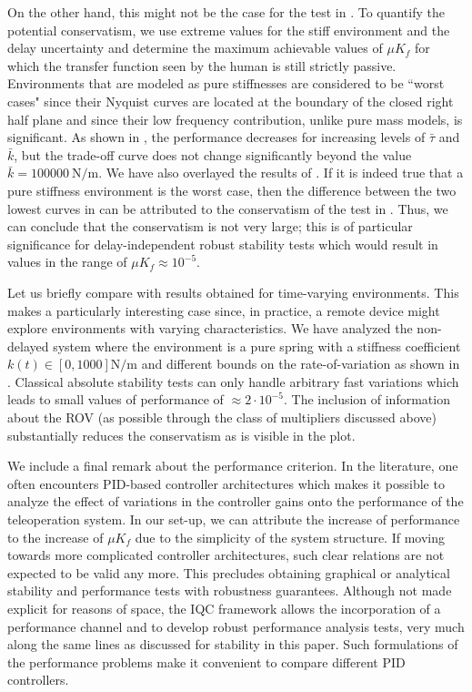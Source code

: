 On the other hand, this might not be the case for the test in . To
quantify the potential conservatism, we use extreme values for
the stiff environment and the delay uncertainty and determine
the maximum achievable values of $\mu K_f$ for which the transfer
function seen by the human is still strictly passive. Environments that
are modeled as pure stiffnesses are considered to be ``worst
cases" since their Nyquist curves are located at the boundary
of the closed right half plane and since their low frequency
contribution, unlike pure mass models, is significant. As shown in
, the performance decreases for increasing
levels of $\bar{\tau}$ and $\bar{k}$, but the trade-off curve does not change
significantly beyond the value $\bar{k} = \SI{100000}{\newton\per\metre}$. We have
also overlayed the results of . If it is indeed true
that a pure stiffness environment is the worst case, then the
difference between the two lowest curves in  can
be attributed to the conservatism of the test in .
Thus, we can conclude that the conservatism is not very large; this is of particular
significance for delay-independent robust stability tests which
would result in values in the range of $\mu K_f \approx 10^{-5}$.


Let us briefly compare with results obtained for time-varying
environments. This makes a particularly interesting
case since, in practice, a remote device might explore environments
with varying characteristics. We have analyzed
the non-delayed system where the environment is a pure
spring with a stiffness coefficient $k(t) \in [0,1000]\si{\newton\per\metre}$ and
different bounds on the rate-of-variation as shown in .
Classical absolute stability tests can only handle arbitrary
fast variations which leads to small values of performance
of $\approx 2\cdot 10^{-5}$. The inclusion of information about the ROV
(as possible through the class of multipliers discussed above)
substantially reduces the conservatism as is visible in the plot.



We include a final remark about the performance criterion.
In the literature, one often encounters PID-based controller
architectures which makes it possible to analyze the effect
of variations in the controller gains onto the performance of
the teleoperation system. In our set-up, we can attribute the increase of performance to the
increase of $\mu K_f$ due to the simplicity of the system structure.
If moving towards more complicated controller architectures,
such clear relations are not expected to be valid any more.
This precludes obtaining graphical or analytical stability and
performance tests with robustness guarantees. Although not
made explicit for reasons of space, the IQC framework allows
the incorporation of a performance channel and to develop
robust performance analysis tests, very much along the same
lines as discussed for stability in this paper. Such formulations
of the performance problems make it convenient to compare 
different PID controllers. 

